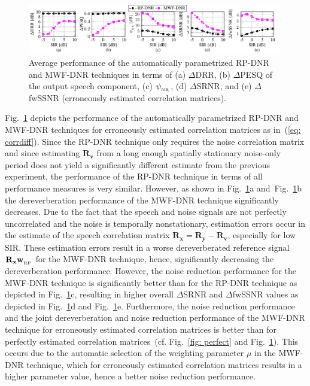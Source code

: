 \documentclass[draftcls,onecolumn,11pt]{IEEEtran}
\begin{document}
\begin{figure}[t!]
\centering
\includegraphics[width=0.99\textwidth]{Plots2/est_all.pdf}
\caption{Average performance of the automatically parametrized RP-DNR and MWF-DNR techniques in terms of (a) $\Delta$DRR, (b) $\Delta$PESQ of the output speech component, (c) $\psi_{_{\rm NR}} $, (d) $\Delta$SRNR, and (e) $\Delta$fwSSNR (erroneously estimated correlation matrices).}
\label{fig: estimate}
\end{figure}
Fig.~\ref{fig: estimate} depicts the performance of the automatically parametrized RP-DNR and MWF-DNR techniques for erroneously estimated correlation matrices as in~(\ref{eq: corrdiff}).
Since the RP-DNR technique only requires the noise correlation matrix and since estimating $\mathbf{R}_{\mathbf{v}}$ from a long enough spatially stationary noise-only period does not yield a significantly different estimate from the previous experiment, the performance of the RP-DNR technique in terms of all performance measures is very similar.
However, as shown in Fig.~\ref{fig: estimate}a and~Fig.~\ref{fig: estimate}b the dereverberation performance of the MWF-DNR technique significantly decreases.
Due to the fact that the speech and noise signals are not perfectly uncorrelated and the noise is temporally nonstationary, estimation errors occur in the estimate of the speech correlation matrix $\mathbf{R}_{\mathbf{x}} = \mathbf{R}_{\mathbf{y}} - \mathbf{R}_{\mathbf{v}}$, especially for low SIR.
These estimation errors result in a worse dereverberated reference signal $\mathbf{R}_{\mathbf{x}}\mathbf{w}_{_{\rm RP}}$ for the MWF-DNR technique, hence, significantly decreasing the dereverberation performance. 
However, the noise reduction performance for the MWF-DNR technique is significantly better than for the RP-DNR technique as depicted in Fig.~\ref{fig: estimate}c, resulting in higher overall $\Delta$SRNR and $\Delta$fwSSNR values as depicted in Fig.~\ref{fig: estimate}d and Fig.~\ref{fig: estimate}e.
Furthermore, the noise reduction performance and the joint dereverberation and noise reduction performance of the MWF-DNR technique for erroneously estimated correlation matrices is better than for perfectly estimated correlation matrices~(cf. Fig.~\ref{fig: perfect} and Fig.~\ref{fig: estimate}).
This occurs due to the automatic selection of the weighting parameter $\mu$ in the MWF-DNR technique, which for erroneously estimated correlation matrices results in a higher parameter value, hence a better noise reduction performance.
\end{document}
